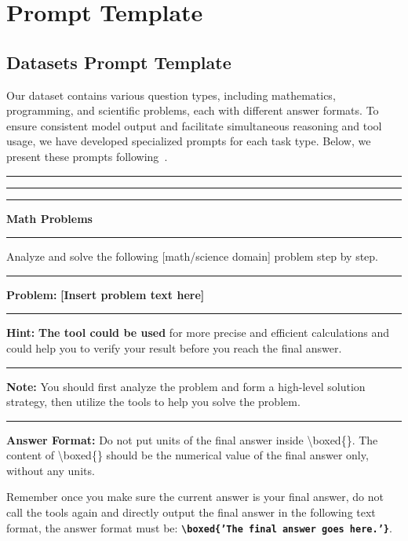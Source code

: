 \section{Prompt Template}


\subsection{Datasets Prompt Template}

\label{dataset_prompt}

Our dataset contains various question types, including mathematics, programming, and scientific problems, each with different answer formats. To ensure consistent model output and facilitate simultaneous reasoning and tool usage, we have developed specialized prompts for each task type. Below, we present these prompts following~\citet{demy}.




\begin{tcolorbox}[
colframe=gray!30,
colback=gray!5,
coltitle=black!100,
title=\textit{\textbf{Prompt Template for verifiable Math Problems}}
]

\rule{1.0\textwidth}{0.4pt}
\hrule
\vspace{0.3ex}
\hrule

\begin{center}
    \textbf{\large Math Problems}
\end{center}
\vspace{-0.8em}
\rule{1.0\textwidth}{0.4pt}

Analyze and solve the following [math/science domain] problem step by step.

\rule{1.0\textwidth}{0.4pt}

\textbf{Problem:} \textcolor{violet!90}{\textbf{[Insert problem text here]}}

\rule{1.0\textwidth}{0.4pt}

\textbf{Hint:} \textcolor{blue!80!black}{\textbf{The tool could be used}} for more precise and efficient calculations and could help you to verify your result before you reach the final answer.

\rule{1.0\textwidth}{0.4pt}

\textbf{Note:} You should first analyze the problem and form a high-level solution strategy, then utilize the tools to help you solve the problem.

\rule{1.0\textwidth}{0.4pt}

\textbf{Answer Format:} Do not put units of the final answer inside \textbackslash{}boxed\{\}. The content of \textbackslash{}boxed\{\} should be the numerical value of the final answer only, without any units.

Remember once you make sure the current answer is your final answer, do not call the tools again and directly output the final answer in the following text format, the answer format must be: \textcolor{red!50!black}{\textbf{\texttt{\textbackslash{}boxed\{'The final answer goes here.'\}}}}.

\end{tcolorbox}


